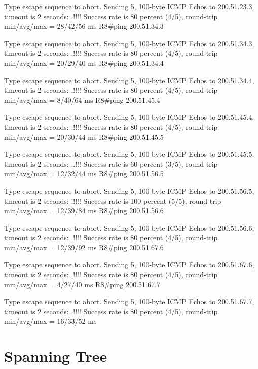 \documentclass[10pt]{article}
\begin{document}
\begin{itemize}
\begin{verbatim*}
Type escape sequence to abort.
Sending 5, 100-byte ICMP Echos to 200.51.23.3, timeout is 2 seconds:
.!!!!
Success rate is 80 percent (4/5), round-trip min/avg/max = 28/42/56 ms
R8#ping 200.51.34.3

Type escape sequence to abort.
Sending 5, 100-byte ICMP Echos to 200.51.34.3, timeout is 2 seconds:
.!!!!
Success rate is 80 percent (4/5), round-trip min/avg/max = 20/29/40 ms
R8#ping 200.51.34.4

Type escape sequence to abort.
Sending 5, 100-byte ICMP Echos to 200.51.34.4, timeout is 2 seconds:
.!!!!
Success rate is 80 percent (4/5), round-trip min/avg/max = 8/40/64 ms
R8#ping 200.51.45.4

Type escape sequence to abort.
Sending 5, 100-byte ICMP Echos to 200.51.45.4, timeout is 2 seconds:
.!!!!
Success rate is 80 percent (4/5), round-trip min/avg/max = 20/30/44 ms
R8#ping 200.51.45.5

Type escape sequence to abort.
Sending 5, 100-byte ICMP Echos to 200.51.45.5, timeout is 2 seconds:
..!!!
Success rate is 60 percent (3/5), round-trip min/avg/max = 12/32/44 ms
R8#ping 200.51.56.5

Type escape sequence to abort.
Sending 5, 100-byte ICMP Echos to 200.51.56.5, timeout is 2 seconds:
!!!!!
Success rate is 100 percent (5/5), round-trip min/avg/max = 12/39/84 ms
R8#ping 200.51.56.6

Type escape sequence to abort.
Sending 5, 100-byte ICMP Echos to 200.51.56.6, timeout is 2 seconds:
.!!!!
Success rate is 80 percent (4/5), round-trip min/avg/max = 12/39/92 ms
R8#ping 200.51.67.6

Type escape sequence to abort.
Sending 5, 100-byte ICMP Echos to 200.51.67.6, timeout is 2 seconds:
.!!!!
Success rate is 80 percent (4/5), round-trip min/avg/max = 4/27/40 ms
R8#ping 200.51.67.7

Type escape sequence to abort.
Sending 5, 100-byte ICMP Echos to 200.51.67.7, timeout is 2 seconds:
.!!!!
Success rate is 80 percent (4/5), round-trip min/avg/max = 16/33/52 ms
\end{verbatim*}
\end{itemize}
\section{Spanning Tree}
\end{document}
